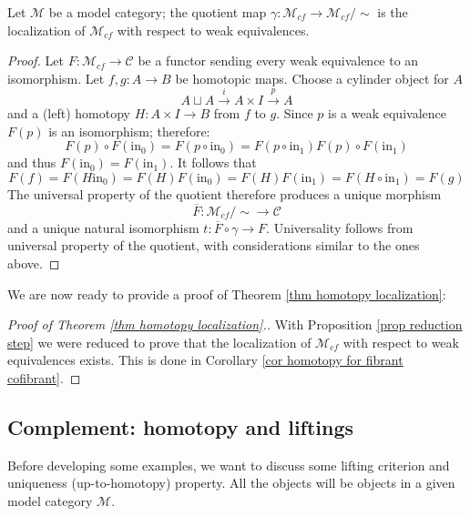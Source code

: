 \begin{refsection}
\begin{cor} \label{cor homotopy for fibrant cofibrant}
Let $\mathcal M$ be a model category; the quotient map $\gamma \colon \mathcal M_{cf} \to \mathcal M_{cf} / \sim$ is the localization of $\mathcal M_{cf}$ with respect to weak equivalences.
\end{cor}

\begin{proof}
Let $F \colon \mathcal M_{cf} \to \mathcal C$ be a functor sending every weak equivalence to an isomorphism. Let $f,g \colon A \to B$ be homotopic maps. Choose a cylinder object for $A$
\[
A \sqcup A \xrightarrow{i} A \times I \xrightarrow{p} A
\]
and a (left) homotopy $H \colon A \times I \to B$ from $f$ to $g$. Since $p$ is a weak equivalence $F(p)$ is an isomorphism; therefore:
\[
F(p) \circ F(\mathrm{in}_0) = F(p \circ \mathrm{in}_0) = F(p \circ \mathrm{in}_1) F(p) \circ F(\mathrm{in}_1)
\]
and thus $F(\mathrm{in}_0) = F(\mathrm{in}_1)$. It follows that
\[
F(f) = F(H \mathrm{in}_0) = F(H) F(\mathrm{in}_0) = F(H) F(\mathrm{in}_1) = F(H \circ \mathrm{in_1}) = F(g)
\]
The universal property of the quotient therefore produces a unique morphism
\[
\overline{F} \colon \mathcal M_{cf} / \sim \to \mathcal C
\]
and a unique natural isomorphism $t \colon \overline{F} \circ \gamma \to F$. Universality follows from universal property of the quotient, with considerations similar to the ones above.
\end{proof}

We are now ready to provide a proof of Theorem \ref{thm homotopy localization}:

\begin{proof}[Proof of Theorem \ref{thm homotopy localization}.]
With Proposition \ref{prop reduction step} we were reduced to prove that the localization of $\mathcal M_{cf}$ with respect to weak equivalences exists. This is done in Corollary \ref{cor homotopy for fibrant cofibrant}.
\end{proof}

\subsection{Complement: homotopy and liftings}

Before developing some examples, we want to discuss some lifting criterion and uniqueness (up-to-homotopy) property. All the objects will be objects in a given model category $\mathcal M$.


\end{refsection}
